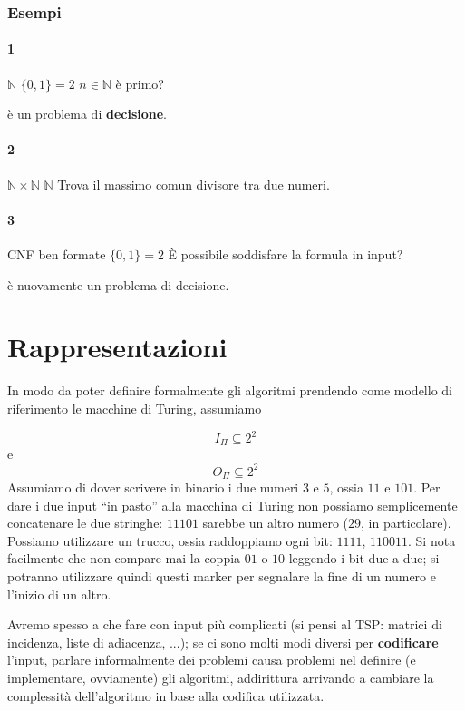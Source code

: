 \subsubsection{Esempi}
\paragraph{1}
 {$\mathbb{N}$} {$\{0, 1\} = 2$} {$n \in \mathbb{N}$ è primo?}

è un problema di \textbf{decisione}.

\paragraph{2}
 {$\mathbb{N}\times\mathbb{N}$} {$\mathbb{N}$}
{Trova il massimo comun divisore tra due numeri.}

\paragraph{3}
 {CNF ben formate} {$\{0, 1\} = 2$} {\`E possibile soddisfare la formula in input?}

è nuovamente un problema di decisione.

\section{Rappresentazioni}
In modo da poter definire formalmente gli algoritmi prendendo come modello
di riferimento le macchine di Turing, assumiamo

$$
	I_{\Pi} \subseteq 2^2
$$
e
$$
	O_{\Pi} \subseteq 2^2
$$
Assumiamo di dover scrivere in binario i due numeri $3$ e $5$, ossia $11$ e $101$.
Per dare i due input ``in pasto'' alla macchina di Turing non possiamo
semplicemente concatenare le due stringhe: $11101$ sarebbe un altro numero
($29$, in particolare). Possiamo utilizzare un trucco, ossia raddoppiamo ogni
bit: $1111$, $110011$. Si nota facilmente che non compare mai la coppia $01$ o
$10$ leggendo i bit due a due; si potranno utilizzare quindi questi marker per
segnalare la fine di un numero e l'inizio di un altro.

Avremo spesso a che fare con input più complicati
(si pensi al \textsc{TSP}: matrici di incidenza, liste di adiacenza, ...);
se ci sono molti modi diversi per \textbf{codificare} l'input, parlare informalmente
dei problemi causa problemi nel definire (e implementare, ovviamente)
gli algoritmi, addirittura arrivando a cambiare la complessità dell'algoritmo
in base alla codifica utilizzata.

